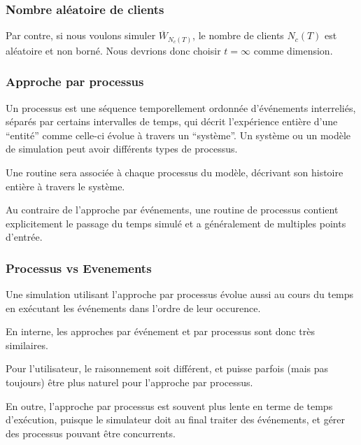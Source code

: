 \documentclass[t,usepdftitle=false]{beamer}
\begin{document}
\begin{frame}
\frametitle{Nombre aléatoire de clients}

Par contre, si nous voulons simuler $\overline{W}_{N_c(T)}$, le nombre de clients
$N_c(T)$ est aléatoire et non borné.
Nous devrions donc choisir $t=\infty$ comme dimension.

\end{frame}

\begin{frame}
\frametitle{Approche par processus}

Un processus est une séquence temporellement ordonnée d'événements interreliés, séparés par certains intervalles de temps,
qui décrit l'expérience entière d'une ``entité'' comme celle-ci évolue à travers un ``système''.
Un système ou un modèle de simulation peut avoir différents types de
processus.

\mbox{}

Une routine sera associée à chaque processus du modèle, décrivant son
histoire entière à travers le système.

\mbox{}

Au contraire de l'approche par événements, une routine de processus
contient explicitement le passage du temps simulé et a généralement de
multiples points d'entrée.

\end{frame}

\begin{frame}
\frametitle{Processus vs Evenements}

Une simulation utilisant l'approche par processus évolue aussi au
cours du temps en exécutant les événements dans l'ordre de leur
occurence.

\mbox{}
En interne, les approches par événement et par processus sont donc
très similaires.

\mbox{}

Pour l'utilisateur, le raisonnement soit
différent, et puisse parfois (mais pas toujours) être plus naturel pour l'approche par processus.

\mbox{}

En outre, l'approche par processus est souvent plus lente en terme de
temps d'exécution, puisque le simulateur doit au final traiter des
événements, et gérer des processus pouvant être concurrents.

\end{frame}
\end{document}
